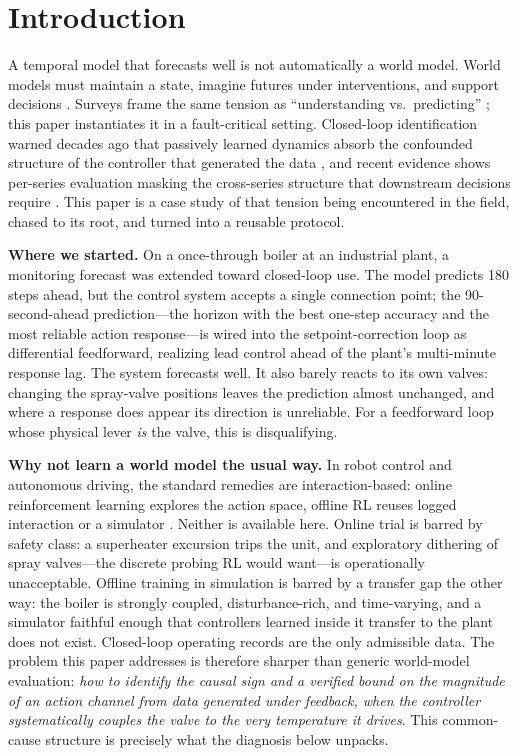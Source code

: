 \documentclass{article}
\begin{document}
\section{Introduction}

A temporal model that forecasts well is not automatically a world model. World models
must maintain a state, imagine futures under interventions, and support decisions
\cite{ha2018world,hafner2023dreamerv3}. Surveys frame the same tension as
``understanding vs.\ predicting'' \cite{ding2024understanding}; this paper
instantiates it in a fault-critical setting. Closed-loop identification warned
decades ago that passively learned dynamics absorb the confounded structure of the
controller that generated the data \cite{forssell1999closedloop}, and recent
evidence shows per-series evaluation masking the cross-series structure that
downstream decisions require \cite{wan2026forecast}. This paper is a case study of
that tension being encountered in the field, chased to its root, and turned into a
reusable protocol.

\textbf{Where we started.} On a once-through boiler at an industrial plant, a
monitoring forecast was extended toward closed-loop use. The model predicts 180 steps
ahead, but the control system accepts a single connection point; the 90-second-ahead
prediction---the horizon with the best one-step accuracy and the most reliable action
response---is wired into the setpoint-correction loop as differential feedforward,
realizing lead control ahead of the plant's multi-minute response lag. The system
forecasts well. It also barely reacts to its own valves: changing the spray-valve
positions leaves the prediction almost unchanged, and where a response does appear its
direction is unreliable. For a feedforward loop whose physical lever \emph{is} the
valve, this is disqualifying.

\textbf{Why not learn a world model the usual way.} In robot control and autonomous
driving, the standard remedies are interaction-based: online reinforcement learning
explores the action space, offline RL reuses logged interaction or a simulator
\cite{hafner2023dreamerv3}. Neither is available here. Online trial is barred by
safety class: a superheater excursion trips the unit, and exploratory dithering of
spray valves---the discrete probing RL would want---is operationally unacceptable.
Offline training in simulation is barred by a transfer gap the other way: the boiler
is strongly coupled, disturbance-rich, and time-varying, and a simulator faithful
enough that controllers learned inside it transfer to the plant does not exist.
Closed-loop operating records are the only admissible data. The problem this paper
addresses is therefore sharper than generic world-model evaluation: \emph{how to
identify the causal sign and a verified bound on the magnitude of an action channel
from data generated under feedback, when the controller systematically couples the
valve to the very temperature it drives}. This common-cause structure is precisely what the diagnosis
below unpacks.
\end{document}
